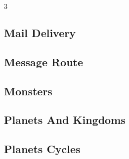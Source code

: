 \documentclass[8pt]{extarticle}
\begin{document}
\begin{multicols*}{3}
\subsection{Mail Delivery}
\begin{caixaenunciado}

\end{caixaenunciado}
\vspace{0.3cm}


\subsection{Message Route}
\begin{caixaenunciado}

\end{caixaenunciado}
\vspace{0.3cm}


\subsection{Monsters}
\begin{caixaenunciado}

\end{caixaenunciado}
\vspace{0.3cm}


\subsection{Planets And Kingdoms}
\begin{caixaenunciado}

\end{caixaenunciado}
\vspace{0.3cm}


\subsection{Planets Cycles}
\begin{caixaenunciado}

\end{caixaenunciado}
\vspace{0.3cm}



\end{multicols*}
\end{document}

